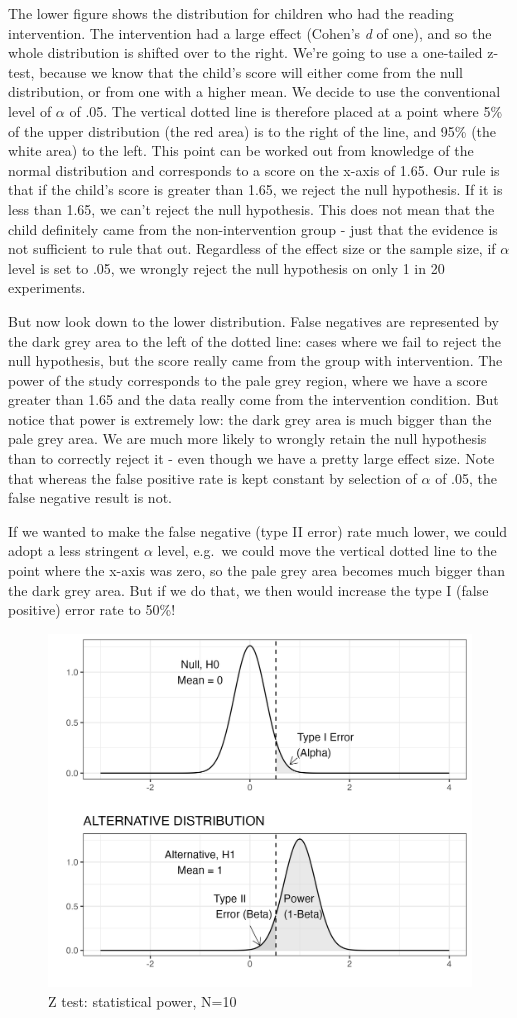 \documentclass{krantz}
\begin{document}
The lower figure shows the distribution for children who had the reading intervention. The intervention had a large effect (Cohen's \emph{d} of one), and so the whole distribution is shifted over to the right. We're going to use a one-tailed z-test, because we know that the child's score will either come from the null distribution, or from one with a higher mean. We decide to use the conventional level of \(\alpha\) of .05. The vertical dotted line is therefore placed at a point where 5\% of the upper distribution (the red area) is to the right of the line, and 95\% (the white area) to the left. This point can be worked out from knowledge of the normal distribution and corresponds to a score on the x-axis of 1.65. Our rule is that if the child's score is greater than 1.65, we reject the null hypothesis. If it is less than 1.65, we can't reject the null hypothesis. This does not mean that the child definitely came from the non-intervention group - just that the evidence is not sufficient to rule that out. Regardless of the effect size or the sample size, if \(\alpha\) level is set to .05, we wrongly reject the null hypothesis on only 1 in 20 experiments.

But now look down to the lower distribution. False negatives are represented by the dark grey area to the left of the dotted line: cases where we fail to reject the null hypothesis, but the score really came from the group with intervention. The power of the study corresponds to the pale grey region, where we have a score greater than 1.65 and the data really come from the intervention condition. But notice that power is extremely low: the dark grey area is much bigger than the pale grey area. We are much more likely to wrongly retain the null hypothesis than to correctly reject it - even though we have a pretty large effect size. Note that whereas the false positive rate is kept constant by selection of \(\alpha\) of .05, the false negative result is not.

If we wanted to make the false negative (type II error) rate much lower, we could adopt a less stringent \(\alpha\) level, e.g.~we could move the vertical dotted line to the point where the x-axis was zero, so the pale grey area becomes much bigger than the dark grey area. But if we do that, we then would increase the type I (false positive) error rate to 50\%!

\begin{figure}
\includegraphics[width=0.6\linewidth]{images_bw/densplot2} \caption{Z test: statistical power, N=10}\label{fig:densplot2}
\end{figure}
\end{document}
